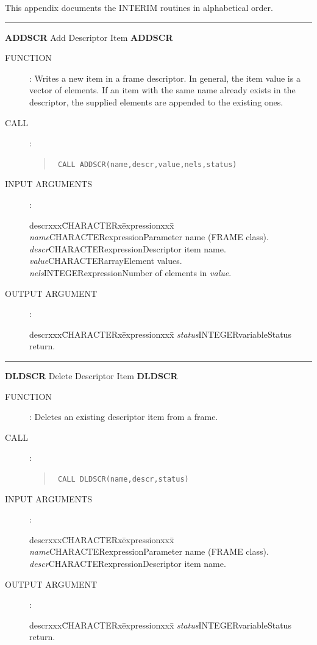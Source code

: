 \documentclass[twoside,11pt]{starlink}
\begin{document}
\small
\begin{terminalv}
This appendix documents the INTERIM routines in alphabetical order.\\
\rule{\textwidth}{0.3mm}
{\Large \textbf{ADDSCR} \hfill Add Descriptor Item \hfill \textbf{ADDSCR}}
\begin{description}
  \item [FUNCTION]:
  Writes a new item in a frame descriptor.
  In general, the item value is a vector of elements.
  If  an item with the same name already exists in the descriptor, the supplied
  elements are appended to the existing ones.
  \item [CALL]:
  \begin{quote}
    \texttt{ CALL ADDSCR(name,descr,value,nels,status)}
  \end{quote}
  \item [INPUT ARGUMENTS]:
  \begin{tabbing}
    descrxxx\=CHARACTERx\=expressionxxx\=\kill
    \emph{name}\>CHARACTER\>expression\>Parameter name (FRAME class).\\
    \emph{descr}\>CHARACTER\>expression\>Descriptor item name.\\
    \emph{value}\>CHARACTER\>array\>Element values.\\
    \emph{nels}\>INTEGER\>expression\>Number of elements in \emph{value}.
  \end{tabbing}
  \item [OUTPUT ARGUMENT]:
  \begin{tabbing}
    descrxxx\=CHARACTERx\=expressionxxx\=\kill
    \emph{status}\>INTEGER\>variable\>Status return.
  \end{tabbing}
\end{description}
\goodbreak
\rule{\textwidth}{0.3mm}
{\Large \textbf{DLDSCR} \hfill Delete Descriptor Item \hfill \textbf{DLDSCR}}
\begin{description}
  \item [FUNCTION]:
  Deletes an existing descriptor item from a frame.
  \item [CALL]:
  \begin{quote}
    \texttt{ CALL DLDSCR(name,descr,status)}
  \end{quote}
  \item [INPUT ARGUMENTS]:
  \begin{tabbing}
    descrxxx\=CHARACTERx\=expressionxxx\=\kill
    \emph{name}\>CHARACTER\>expression\>Parameter name (FRAME class).\\
    \emph{descr}\>CHARACTER\>expression\>Descriptor item name.
  \end{tabbing}
  \item [OUTPUT ARGUMENT]:
  \begin{tabbing}
    descrxxx\=CHARACTERx\=expressionxxx\=\kill
    \emph{status}\>INTEGER\>variable\>Status return.
  \end{tabbing}
\end{description}
\goodbreak
\end{terminalv}
\normalsize
\end{document}
